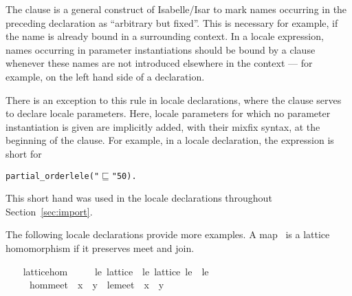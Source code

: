 \begin{isabellebody}
\begin{isamarkuptext}
  The  clause is a general construct of Isabelle/Isar
  to mark names occurring in the preceding declaration as ``arbitrary
  but fixed''.  This is necessary for example, if the name is already
  bound in a surrounding context.  In a locale expression, names
  occurring in parameter instantiations should be bound by a
   clause whenever these names are not introduced
  elsewhere in the context --- for example, on the left hand side of a
   declaration.

  There is an exception to this rule in locale declarations, where the
   clause serves to declare locale parameters.  Here,
  locale parameters for which no parameter instantiation is given are
  implicitly added, with their mixfix syntax, at the beginning of the
   clause.  For example, in a locale declaration, the
  expression  is short for
\begin{small}
\begin{alltt}
  partial_order le  le ( "\(\sqsubseteq\)" 50)\textrm{.}
\end{alltt}
\end{small}
  This short hand was used in the locale declarations throughout
  Section~\ref{sec:import}.%
\end{isamarkuptext}%
\isamarkuptrue%
%
\begin{isamarkuptext}%
The following locale declarations provide more examples.  A
  map~ is a lattice homomorphism if it preserves meet and
  join.%
\end{isamarkuptext}%
\isamarkuptrue%
\ \ \isamarkupfalse%
\ lattice{}hom\ {}\isanewline
\ \ \ \ le{}\ lattice\ {}\ le{}{}\ lattice\ le{}\ \ le{}\ {}\ {}{}{}\ {}{}{}\ {}\isanewline
\ \ \ \ \ {}\isanewline
\ \ \ \ \ hom{}meet{}\ {}{}\ {}x\ {}\ y{}\ {}\ le{}{}meet\ {}{}\ x{}\ {}{}\ y{}{}\isanewline

\end{isabellebody}
